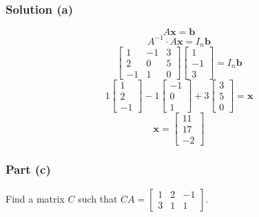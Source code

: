 \documentclass[12pt]{article}
\begin{document}
\subsubsection*{Solution (a)}
\[
  A\textbf{x} = \textbf{b}
\]
\[
  A^{-1} \cdot A\textbf{x} = I_{n}\textbf{b}
\]
\[
  \begin{bmatrix}
    1 & -1 & 3\\ 
    2 & 0 & 5\\ 
    -1 & 1 & 0 
  \end{bmatrix}
  \begin{bmatrix}
    1\\ 
    -1\\ 
    3 
  \end{bmatrix}
  = 
  I_{n}\textbf{b}
\]
\[
  1\begin{bmatrix}
    1\\ 
    2\\ 
    -1 
  \end{bmatrix}
  - 1\begin{bmatrix}
    -1\\ 
    0\\ 
    1 
  \end{bmatrix}
  + 3\begin{bmatrix}
    3\\ 
    5\\ 
    0 
  \end{bmatrix}
  = \textbf{x}
\]
\vspace{0.25in}
\[
  \textbf{x} = 
  \begin{bmatrix}
    11\\ 
    17\\ 
    -2 
  \end{bmatrix}
\]
\vspace{0.25in}
\subsubsection*{Part (c)}
Find a matrix $C$ such that $CA = 
\begin{bmatrix}
  1 & 2 & -1\\ 
  3 & 1 & 1 
\end{bmatrix}$. 
\vspace{0.25in}
\end{document}
